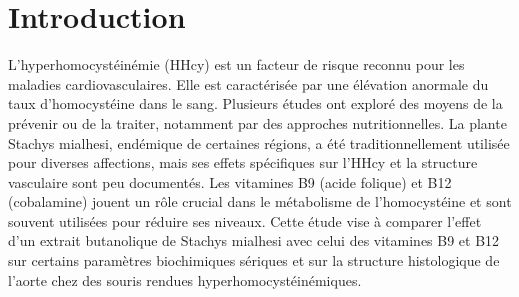 \section{Introduction}
L'hyperhomocystéinémie (HHcy) est un facteur de risque reconnu pour les maladies cardiovasculaires. Elle est caractérisée par une élévation anormale du taux d'homocystéine dans le sang. Plusieurs études ont exploré des moyens de la prévenir ou de la traiter, notamment par des approches nutritionnelles.
La plante Stachys mialhesi, endémique de certaines régions, a été traditionnellement utilisée pour diverses affections, mais ses effets spécifiques sur l'HHcy et la structure vasculaire sont peu documentés.
Les vitamines B9 (acide folique) et B12 (cobalamine) jouent un rôle crucial dans le métabolisme de l'homocystéine et sont souvent utilisées pour réduire ses niveaux.
Cette étude vise à comparer l'effet d'un extrait butanolique de Stachys mialhesi avec celui des vitamines B9 et B12 sur certains paramètres biochimiques sériques et sur la structure histologique de l'aorte chez des souris rendues hyperhomocystéinémiques.
